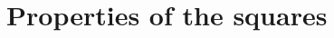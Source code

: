 \section{Properties of the squares} %
\label{PropertiesOfTheSquares}
\ifx\OutputPropertiesOfTheSquares\undefined\else
%
%

